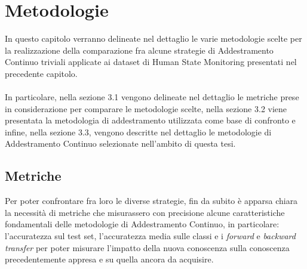 \chapter{Metodologie}
In questo capitolo verranno delineate nel dettaglio le varie metodologie scelte per la realizzazione della comparazione fra alcune strategie di Addestramento Continuo triviali applicate ai dataset di Human State Monitoring presentati nel precedente capitolo.\\\\
In particolare, nella sezione 3.1 vengono delineate nel dettaglio le metriche prese in considerazione per comparare le metodologie scelte, nella sezione 3.2 viene presentata la metodologia di addestramento utilizzata come base di confronto e infine, nella sezione 3.3, vengono descritte nel dettaglio le metodologie di Addestramento Continuo selezionate nell'ambito di questa tesi.
\section{Metriche}
Per poter confrontare fra loro le diverse strategie, fin da subito è apparsa chiara la necessità di metriche che misurassero con precisione alcune caratteristiche fondamentali delle metodologie di Addestramento Continuo, in particolare: l'accuratezza sul test set, l'accuratezza media sulle classi e i \textit{forward} e \textit{backward transfer} per poter misurare l'impatto della nuova conoscenza sulla conoscenza precedentemente appresa e su quella ancora da acquisire.
